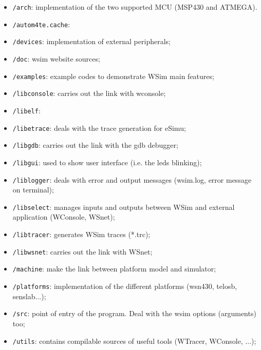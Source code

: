 \documentclass[a4paper,10pt]{report}
\begin{document}
\begin{itemize}
  \item \verb$/arch$: implementation of the two supported MCU (MSP430 and ATMEGA).

  \item \verb$/autom4te.cache$:

  \item \verb$/devices$: implementation of external peripherals;

  \item \verb$/doc$: wsim website sources;

  \item \verb$/examples$: example codes to demonstrate WSim main features;

  \item \verb$/libconsole$: carries out the link with wconsole;

  \item \verb$/libelf$:

  \item \verb$/libetrace$: deals with the trace generation for eSimu;

  \item \verb$/libgdb$: carries out the link with the gdb debugger;

  \item \verb$/libgui$: used to show user interface (i.e. the leds blinking);

  \item \verb$/liblogger$: deals with error and output messages (wsim.log, error message on terminal);

  \item \verb$/libselect$: manages inputs and outputs between WSim and external application (WConsole, WSnet);

  \item \verb$/libtracer$: generates WSim traces (*.trc);

  \item \verb$/libwsnet$: carries out the link with WSnet;

  \item \verb$/machine$: make the link between platform model and simulator;

  \item \verb$/platforms$: implementation of the different platforms (wsn430, telosb, senslab...);

  \item \verb$/src$: point of entry of the program. Deal with the wsim options (arguments) too;

  \item \verb$/utils$: contains compilable sources of useful tools (WTracer, WConsole, ...);
\end{itemize}
\end{document}
